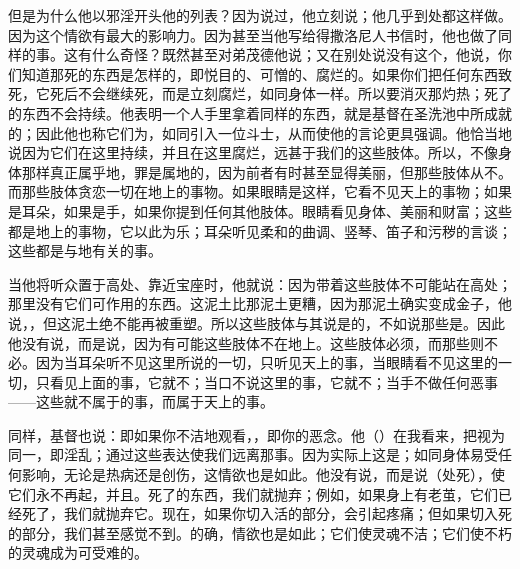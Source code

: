 但是为什么他以邪淫开头他的列表？因为说过，他立刻说；他几乎到处都这样做。因为这个情欲有最大的影响力。因为甚至当他写给得撒洛尼人书信时，他也做了同样的事。这有什么奇怪？既然甚至对弟茂德他说；又在别处说没有这个，他说，你们知道那死的东西是怎样的，即悦目的、可憎的、腐烂的。如果你们把任何东西致死，它死后不会继续死，而是立刻腐烂，如同身体一样。所以要消灭那灼热；死了的东西不会持续。他表明一个人手里拿着同样的东西，就是基督在圣洗池中所成就的；因此他也称它们为，如同引入一位斗士，从而使他的言论更具强调。他恰当地说因为它们在这里持续，并且在这里腐烂，远甚于我们的这些肢体。所以，不像身体那样真正属乎地，罪是属地的，因为前者有时甚至显得美丽，但那些肢体从不。而那些肢体贪恋一切在地上的事物。如果眼睛是这样，它看不见天上的事物；如果是耳朵，如果是手，如果你提到任何其他肢体。眼睛看见身体、美丽和财富；这些都是地上的事物，它以此为乐；耳朵听见柔和的曲调、竖琴、笛子和污秽的言谈；这些都是与地有关的事。\par

当他将听众置于高处、靠近宝座时，他就说：因为带着这些肢体不可能站在高处；那里没有它们可作用的东西。这泥土比那泥土更糟，因为那泥土确实变成金子，他说，，但这泥土绝不能再被重塑。所以这些肢体与其说是的，不如说那些是。因此他没有说，而是说，因为有可能这些肢体不在地上。这些肢体必须，而那些则不必。因为当耳朵听不见这里所说的一切，只听见天上的事，当眼睛看不见这里的一切，只看见上面的事，它就不；当口不说这里的事，它就不；当手不做任何恶事——这些就不属于的事，而属于天上的事。\par

同样，基督也说：即如果你不洁地观看，，即你的恶念。他（）在我看来，把视为同一，即淫乱；通过这些表达使我们远离那事。因为实际上这是；如同身体易受任何影响，无论是热病还是创伤，这情欲也是如此。他没有说，而是说（处死），使它们永不再起，并且。死了的东西，我们就抛弃；例如，如果身上有老茧，它们已经死了，我们就抛弃它。现在，如果你切入活的部分，会引起疼痛；但如果切入死的部分，我们甚至感觉不到。的确，情欲也是如此；它们使灵魂不洁；它们使不朽的灵魂成为可受难的。\par

